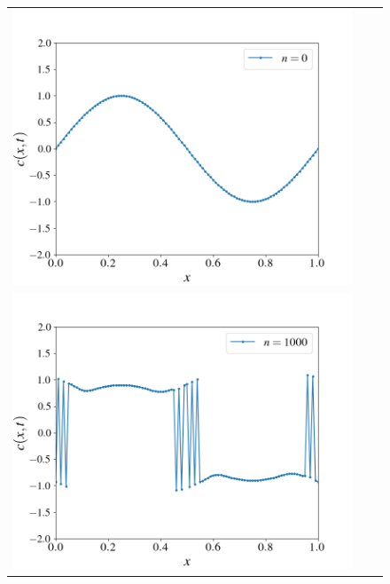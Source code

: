 \documentclass[12pt, reqno]{report}
\theoremstyle{definition}
\theoremstyle{remark}
\begin{document}
\begin{figure}[H]
\begin{tabular}{ccc}
        \includegraphics[width = \acfdwidth]{media_paper/unstable_CH_CN_0} \\
        \includegraphics[width = \acfdwidth]{media_paper/very_stable_CH_CN_1000.png} &

\end{tabular}
\end{figure}
\end{document}
